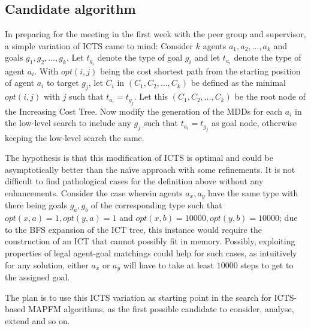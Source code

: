 \documentclass[a4paper,10pt,english]{article}
\begin{document}
	\subsection*{Candidate algorithm}
	\label{candidate}
	In preparing for the meeting in the first week with the peer group and supervisor, a simple variation of ICTS came to mind: Consider $k$ agents $a_1,a_2,\ldots,a_k$ and goals $g_1,g_2,\ldots,g_k$. Let $t_{g_i}$ denote the type of goal $g_i$ and let $t_{a_i}$ denote the type of agent $a_i$. With $opt(i,j)$ being the cost shortest path from the starting position of agent $a_i$ to target $g_j$, let $C_i$ in $(C_1,C_2,\ldots,C_k)$  be defined as the minimal $opt(i,j)$ with $j$ such that $t_{a_i} = t_{g_j}$. Let this $(C_1,C_2,\ldots,C_k)$ be the root node of the Increasing Cost Tree. Now modify the generation of the MDDs for each $a_i$ in the low-level search to include any $g_j$ such that $t_{a_i} = t_{g_j}$ as goal node, otherwise keeping the low-level search the same. 
	
	The hypothesis is that this modification of ICTS is optimal and could be asymptotically better than the naïve approach with some refinements. It is not difficult to find pathological cases for the definition above without any enhancements. Consider the case wherein agents $a_x,a_y$ have the same type with there being goals $g_a,g_b$ of the corresponding type such that $opt(x,a) = 1,opt(y,a) = 1$ and $opt(x,b) = 10000,opt(y,b) = 10000$; due to the BFS expansion of the ICT tree, this instance would require the construction of an ICT that cannot possibly fit in memory. Possibly, exploiting properties of legal agent-goal matchings could help for such cases, as intuitively for any solution, either $a_x$ or $a_y$ will have to take at least $10000$ steps to get to the assigned goal.
	
	The plan is to use this ICTS variation as starting point in the search for ICTS-based MAPFM algorithms, as the first possible candidate to consider, analyse, extend and so on.
\end{document}
